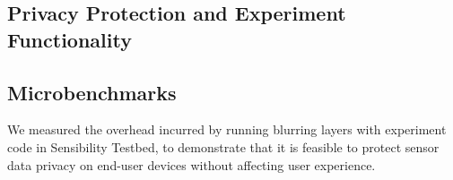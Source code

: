
\subsection{Privacy Protection and Experiment Functionality}\label{sec-experiment}



%
%

\subsection{Microbenchmarks}\label{sec-benchmark}

We measured the overhead incurred by running blurring layers with 
experiment code in Sensibility Testbed, to demonstrate that it is 
feasible to protect sensor data privacy on end-user devices without 
affecting user experience. 

